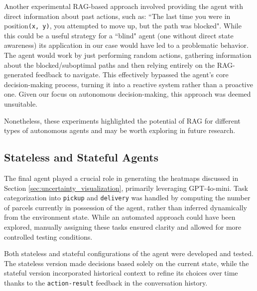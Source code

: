 Another experimental RAG-based approach involved providing the agent with direct
information about past actions, such as: ``The last time you were in position\texttt{(x,
y)}, you attempted to move up, but the path was blocked". While this could be a
useful strategy for a ``blind" agent (one without direct state awareness) its application
in our case would have led to a problematic behavior. The agent would work by
just performing random actions, gathering information about the blocked/suboptimal
paths and then relying entirely on the RAG-generated feedback to navigate. This
effectively bypassed the agent's core decision-making process, turning it into a
reactive system rather than a proactive one. Given our focus on autonomous
decision-making, this approach was deemed unsuitable.

Nonetheless, these experiments highlighted the potential of RAG for different
types of autonomous agents and may be worth exploring in future research.

\subsection{Stateless and Stateful Agents}
\label{sec:stateful_and_stateless_agents_chapAD}

The final agent played a crucial role in generating the heatmaps discussed in Section
\ref{sec:uncertainty_visualization}, primarily leveraging GPT-4o-mini. Task categorization
into \texttt{pickup} and \texttt{delivery} was handled by computing the number of
parcels currently in possession of the agent, rather than inferred dynamically
from the environment state. While an automated approach could have been explored,
manually assigning these tasks ensured clarity and allowed for more controlled
testing conditions.

Both stateless and stateful configurations of the agent were developed and
tested. The stateless version made decisions based solely on the current state,
while the stateful version incorporated historical context to refine its choices
over time thanks to the \texttt{action-result} feedback in the conversation history.

